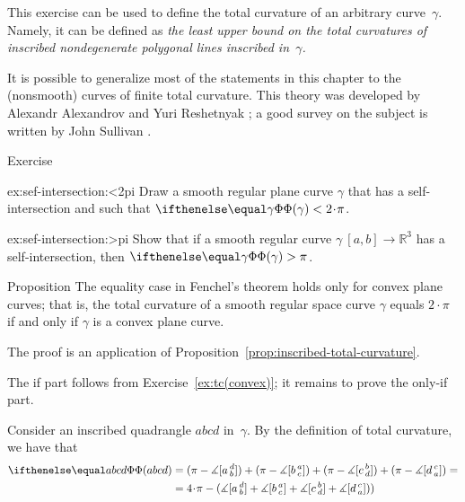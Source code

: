 This exercise can be used to define the total curvature of an arbitrary curve~$\gamma$.
Namely, it can be defined as {}\emph{the least upper bound on the total curvatures of inscribed nondegenerate polygonal lines inscribed in~$\gamma$.}

It is possible to generalize most of the statements in this chapter to the (nonsmooth) curves of finite total curvature.
This theory was developed by Alexandr Alexandrov and Yuri Reshetnyak \cite{aleksandrov-reshetnyak};
a good survey on the subject is written by John Sullivan \cite{sullivan-curves}.

\begin{thm}{Exercise}\label{ex:sef-intersection}

\begin{subthm}{ex:sef-intersection:<2pi}
Draw a smooth regular plane curve $\gamma$ that has a self-intersection and such that $\tc\gamma<2\cdot\pi$.
\end{subthm}

\begin{subthm}{ex:sef-intersection:>pi} Show that if a smooth regular curve $\gamma\:[a,b]\to\mathbb{R}^3$ has a self-intersection, then $\tc\gamma>\pi$.
\end{subthm}

\end{thm}

\begin{thm}{Proposition}\label{prop:fenchel=}
The equality case in Fenchel's theorem holds only for convex plane curves;
that is, the total curvature of a smooth regular space curve $\gamma$ equals $2\cdot\pi$ if and only if $\gamma$ is a convex plane curve.
\end{thm}

The proof is an application of Proposition~\ref{prop:inscribed-total-curvature}.

The if part follows from Exercise~\ref{ex:tc(convex)};
it remains to prove the only-if part.

Consider an inscribed quadrangle $abcd$ in~$\gamma$.
By the definition of total curvature, we have that
\begin{align*}
\tc{abcd}&=(\pi-
\measuredangle\hinge adb)+(\pi-
\measuredangle\hinge bac)+(\pi-
\measuredangle\hinge cbd)+(\pi-
\measuredangle\hinge dca)=
\\
&=4\cdot\pi -(
\measuredangle\hinge adb
+
\measuredangle\hinge bac
+
\measuredangle\hinge cbd
+
\measuredangle\hinge dca))
\end{align*}


